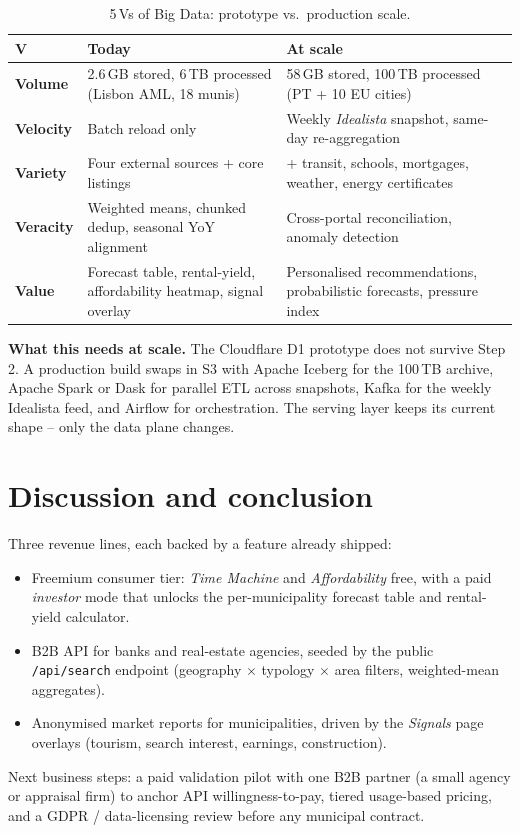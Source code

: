\documentclass[11pt,a4paper]{article}
\begin{document}
\begin{table}[H]
\centering
\renewcommand{\arraystretch}{1.32}
\begin{tabularx}{\linewidth}{@{}>{\bfseries}p{1.7cm}XX@{}}
\toprule
\textbf{V} & \textbf{Today} & \textbf{At scale} \\
\midrule
Volume   & 2.6\,GB stored, 6\,TB processed (Lisbon AML, 18 munis)              & 58\,GB stored, 100\,TB processed (PT + 10 EU cities) \\
Velocity & Batch reload only                                                  & Weekly \emph{Idealista} snapshot, same-day re-aggregation \\
Variety  & Four external sources + core listings                              & + transit, schools, mortgages, weather, energy certificates \\
Veracity & Weighted means, chunked dedup, seasonal YoY alignment              & Cross-portal reconciliation, anomaly detection \\
Value    & Forecast table, rental-yield, affordability heatmap, signal overlay & Personalised recommendations, probabilistic forecasts, pressure index \\
\bottomrule
\end{tabularx}
\caption{5\,Vs of Big Data: prototype vs.\ production scale.}
\label{tab:fivevs}
\end{table}

\textbf{What this needs at scale.} The Cloudflare D1 prototype does not survive Step 2. A production build swaps in S3 with Apache Iceberg for the 100\,TB archive, Apache Spark or Dask for parallel ETL across snapshots, Kafka for the weekly Idealista feed, and Airflow for orchestration. The serving layer keeps its current shape -- only the data plane changes.

\section{Discussion and conclusion}\label{sec:roadmap}

Three revenue lines, each backed by a feature already shipped:
\begin{itemize}
  \item Freemium consumer tier: \emph{Time Machine} and \emph{Affordability} free, with a paid \emph{investor} mode that unlocks the per-municipality forecast table and rental-yield calculator.
  \item B2B API for banks and real-estate agencies, seeded by the public \texttt{/api/search} endpoint (geography $\times$ typology $\times$ area filters, weighted-mean aggregates).
  \item Anonymised market reports for municipalities, driven by the \emph{Signals} page overlays (tourism, search interest, earnings, construction).
\end{itemize}
Next business steps: a paid validation pilot with one B2B partner (a small agency or appraisal firm) to anchor API willingness-to-pay, tiered usage-based pricing, and a GDPR / data-licensing review before any municipal contract.
\end{document}
